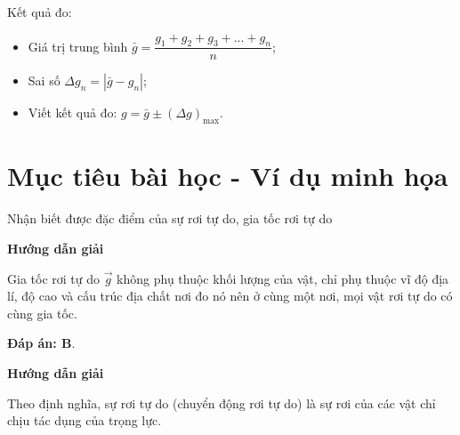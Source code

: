 Kết quả đo:
\begin{itemize}
	\item Giá trị trung bình $\bar{g} = \dfrac{g_1 + g_2 + g_3 + \ldots + g_n}{n}$;
	\item Sai số $\Delta g_n = |\bar{g} - g_n|$;
	\item Viết kết quả đo: $g=\bar{g} \pm (\Delta g)_\text{max}$.
\end{itemize}
\section{Mục tiêu bài học - Ví dụ minh họa}
\begin{dang}{Nhận biết được đặc điểm của sự rơi tự do, gia tốc rơi tự do}
	{	\begin{center}
			\textbf{Hướng dẫn giải}
		\end{center}
		
		Gia tốc rơi tự do $\vec g$ không phụ thuộc khối lượng của vật, chỉ phụ thuộc vĩ độ địa lí, độ cao và cấu trúc địa chất nơi đo nó nên ở cùng một nơi, mọi vật rơi tự do có cùng gia tốc.
		
		\textbf{Đáp án: B}.
	}
	{	\begin{center}
			\textbf{Hướng dẫn giải}
		\end{center}
		
		Theo định nghĩa, sự rơi tự do (chuyển động rơi tự do) là sự rơi của các vật chỉ chịu tác dụng của trọng lực.
		
}
\end{dang}
